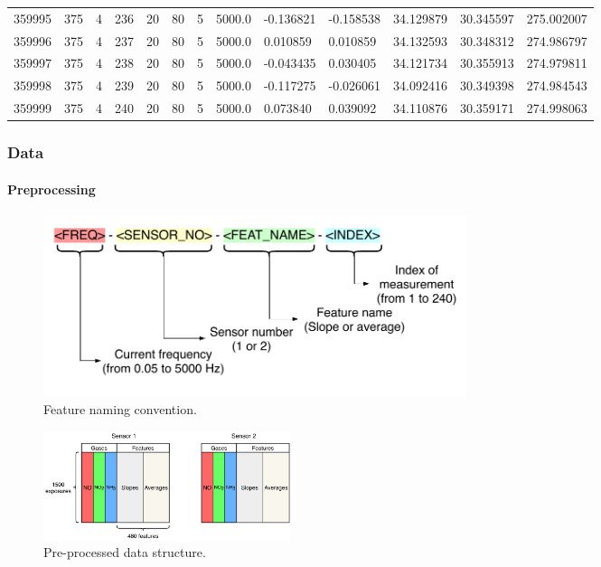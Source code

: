 \documentclass{beamer}
\begin{document}
\begin{frame}
\begin{table}[h]
{\begin{tabular}{p{1.5cm}p{1.3cm}p{0.8cm}p{1.3cm}p{0.8cm}p{0.8cm}p{1.8cm}p{1.8cm}p{1.8cm}p{1.8cm}p{1.8cm}p{1.8cm}p{1.8cm}}
				359995 &          375 &         4 &        236 &        20 &         80 &          5 &     5000.0 &              -0.136821 &              -0.158538 &                34.129879 &                30.345597 &              275.002007 \\
				359996 &          375 &         4 &        237 &        20 &         80 &          5 &     5000.0 &               0.010859 &               0.010859 &                34.132593 &                30.348312 &              274.986797 \\
				359997 &          375 &         4 &        238 &        20 &         80 &          5 &     5000.0 &              -0.043435 &               0.030405 &                34.121734 &                30.355913 &              274.979811 \\
				359998 &          375 &         4 &        239 &        20 &         80 &          5 &     5000.0 &              -0.117275 &              -0.026061 &                34.092416 &                30.349398 &              274.984543 \\
				359999 &          375 &         4 &        240 &        20 &         80 &          5 &     5000.0 &               0.073840 &               0.039092 &                34.110876 &                30.359171 &              274.998063 \\
				\bottomrule[0.5mm]
		\end{tabular}}
	\end{table}
\end{frame}


\begin{frame}
	\frametitle{Data}
	\framesubtitle{Preprocessing}
	\begin{figure}[h]
		\centering
		\includegraphics[width=0.6\textwidth]{../../figures/feat-naming.pdf}
		\caption{Feature naming convention.}
		\label{fig:feat-naming}
	\end{figure}

	
	\begin{figure}[h]
		\centering
		\includegraphics[width=0.35\textwidth]{../../figures/data-struct.pdf}
		\caption{Pre-processed data structure.}
		\label{fig:preprocessed-data}
	\end{figure}
\end{frame}
\end{document}
